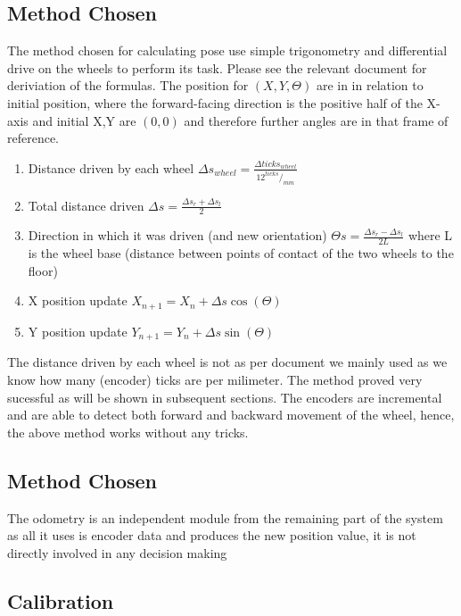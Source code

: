 \documentclass[11pt, a4paper]{article}
\begin{document}
\subsection{Method Chosen}

The method chosen for calculating pose\cite{odo_used} use simple trigonometry and differential drive on 
the wheels to perform its task. Please see the relevant document for deriviation of the formulas. The position for 
${(X,Y,\Theta)}$ are in in relation to initial position, where the forward-facing direction is the positive half of the
X-axis and initial X,Y are ${(0,0)}$ and therefore further angles are in that frame of reference.

\begin{enumerate}

	\item Distance driven by each wheel $\Delta s_{wheel} = \frac {\Delta ticks_{wheel} } {12 ^{ticks}/_{mm}} $
	\item Total distance driven $ \Delta s = \frac{\Delta s_{r} + \Delta s_{l} }{2}$
	\item Direction in which it was driven (and new orientation) $\Theta s = \frac{ \Delta s_{r} - \Delta s_{l} }{2L}$ where L is the wheel base 
	(distance between points of contact of the two wheels to the floor)
	\item X position update $X_{n+1} = X_{n} + \Delta s \cos (\Theta)$
	\item Y position update $Y_{n+1} = Y_{n} + \Delta s \sin (\Theta)$


\end{enumerate}


The distance driven by each wheel is not as per document we mainly used as we know 
how many (encoder) ticks are per milimeter. The method proved very sucessful as 
will be shown in subsequent sections. The encoders are incremental and are able to 
detect both forward and backward movement of the wheel, hence, the above method works 
without any tricks.

\subsection{Method Chosen}

The odometry is an independent module from the remaining part of the system as 
all it uses is encoder data and produces the new position value, it is not directly
involved in any decision making

\subsection{Calibration}
\end{document}
